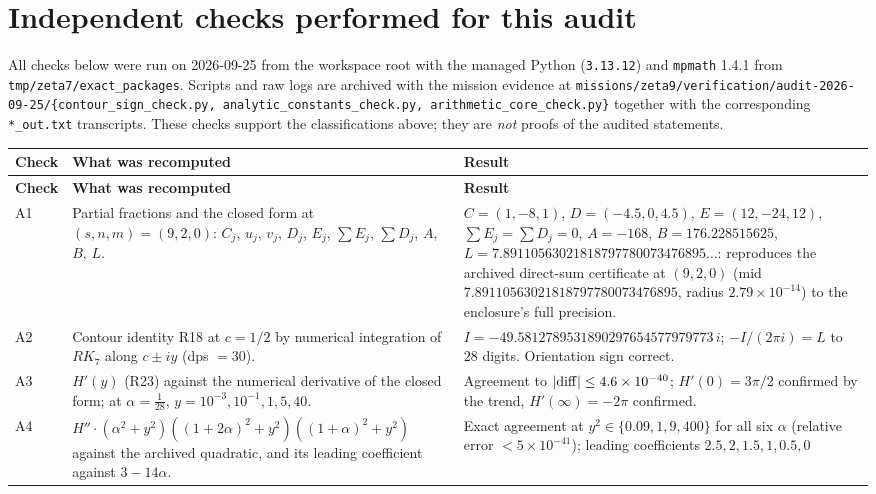 \documentclass[11pt]{article}
\begin{document}
\section{Independent checks performed for this audit}
\label{sec:checks}

All checks below were run on 2026-09-25 from the workspace root with the managed Python
(\texttt{3.13.12}) and \texttt{mpmath} 1.4.1 from \texttt{tmp/zeta7/exact\_packages}. Scripts and raw
logs are archived with the mission evidence at
\texttt{missions/zeta9/verification/audit-2026-09-25/\{contour\_sign\_check.py,\
analytic\_constants\_check.py,\ arithmetic\_core\_check.py\}} together with the corresponding
\texttt{*\_out.txt} transcripts. These checks support the classifications above; they are \emph{not}
proofs of the audited statements.

\begin{longtable}{@{}p{}p{}p{}@{}}
\toprule \textbf{Check} & \textbf{What was recomputed} & \textbf{Result} \\ \midrule
\endfirsthead
\toprule \textbf{Check} & \textbf{What was recomputed} & \textbf{Result} \\ \midrule
\endhead
A1 & Partial fractions and the closed form at $(s,n,m)=(9,2,0)$: $C_j$, $u_j$, $v_j$, $D_j$, $E_j$,
     $\sum E_j$, $\sum D_j$, $A$, $B$, $L$. & $C=(1,-8,1)$, $D=(-4.5,0,4.5)$, $E=(12,-24,12)$,
     $\sum E_j=\sum D_j=0$, $A=-168$, $B=176.228515625$, $L=7.89110563021818797780073476895\ldots$:
     reproduces the archived direct-sum certificate at $(9,2,0)$
     (mid $7.89110563021818797780073476895$, radius $2.79\times10^{-14}$) to the enclosure's full
     precision. \\
A2 & Contour identity R18 at $c=1/2$ by numerical integration of $RK_7$ along $c\pm iy$ (dps $=30$). &
     $I=-49.5812789531890297654577979773\,i$; $-I/(2\pi i)=L$ to $28$ digits. Orientation sign correct. \\
A3 & $H'(y)$ (R23) against the numerical derivative of the closed form; at $\alpha=\tfrac1{28}$,
     $y=10^{-3},10^{-1},1,5,40$. & Agreement to $|{\rm diff}|\le4.6\times10^{-40}$; $H'(0)=3\pi/2$
     confirmed by the trend, $H'(\infty)=-2\pi$ confirmed. \\
A4 & $H''\cdot(\alpha^2+y^2)((1+2\alpha)^2+y^2)((1+\alpha)^2+y^2)$ against the archived quadratic, and
     its leading coefficient against $3-14\alpha$. & Exact agreement at $y^2\in\{0.09,1,9,400\}$ for
     all six $\alpha$ (relative error $<5\times10^{-41}$); leading coefficients $2.5,2,1.5,1,0.5,0$

\end{longtable}
\end{document}
